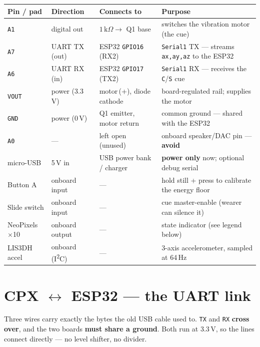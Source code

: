 \documentclass[11pt]{article}
\newcommand{\hdr}[1]{{\color{white}\textbf{#1}}}
\begin{document}
\renewcommand{\arraystretch}{1.25}
\begin{tabularx}{\textwidth}{l l l L}
  \toprule
  \hdr{Pin / pad} & \hdr{Direction} & \hdr{Connects to} & \multicolumn{1}{l}{\hdr{Purpose}} \\
  \midrule
  \texttt{A1}   & digital out   & $1\,\mathrm{k}\Omega \rightarrow$ Q1 base & switches the vibration motor (the cue) \\
  \texttt{A7}   & UART TX (out) & ESP32 \texttt{GPIO16} (RX2)               & \texttt{Serial1} TX --- streams \texttt{ax,ay,az} to the ESP32 \\
  \texttt{A6}   & UART RX (in)  & ESP32 \texttt{GPIO17} (TX2)               & \texttt{Serial1} RX --- receives the \texttt{C}/\texttt{S} cue \\
  \texttt{VOUT} & power (3.3\,V)& motor\,(+), diode cathode                 & board-regulated rail; supplies the motor \\
  \texttt{GND}  & power (0\,V)  & Q1 emitter, motor return                  & common ground --- shared with the ESP32 \\
  \texttt{A0}   & ---           & left open (unused)                        & onboard speaker/DAC pin --- \textbf{avoid} \\
  micro-USB     & 5\,V in       & USB power bank / charger                  & \textbf{power only} now; optional debug serial \\
  Button A      & onboard input & ---                                       & hold still + press to calibrate the energy floor \\
  Slide switch  & onboard input & ---                                       & cue master-enable (wearer can silence it) \\
  NeoPixels $\times$10 & onboard output & ---                               & state indicator (see legend below) \\
  LIS3DH accel  & onboard (I\textsuperscript{2}C) & ---                     & 3-axis accelerometer, sampled at 64\,Hz \\
  \bottomrule
\end{tabularx}

\section{CPX $\leftrightarrow$ ESP32 --- the UART link}

\noindent
Three wires carry exactly the bytes the old USB cable used to. \texttt{TX} and \texttt{RX}
\textbf{cross over}, and the two boards \textbf{must share a ground}. Both run at 3.3\,V, so the
lines connect directly --- no level shifter, no divider.
\end{document}
